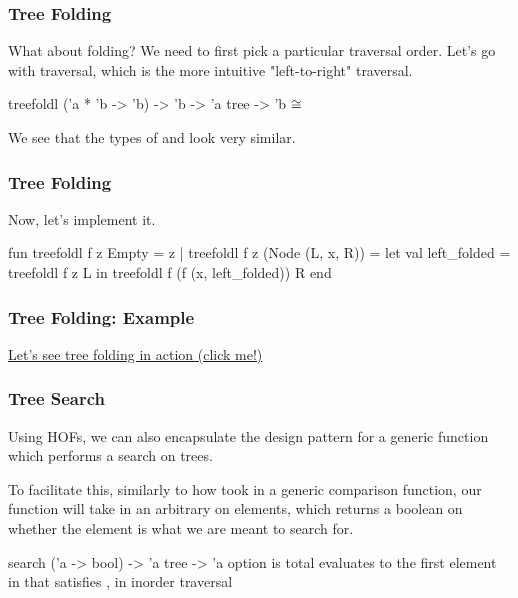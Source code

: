 \documentclass[aspectratio=169]{beamer}
\begin{document}
\begin{frame}[fragile]
  \frametitle{Tree Folding}

  What about folding? We need to first pick a particular traversal order. Let's
  go with  traversal, which is the more intuitive "left-to-right"
  traversal.

  \pause
  \vspace{\fill}

  \spec
    {treefoldl}
    {('a * 'b -> 'b) -> 'b -> 'a tree -> 'b}
    {}
    { $\cong$ }

  \pause
  \vspace{\fill}

  We see that the types of  and  look very
  similar.
\end{frame}

\begin{frame}[fragile]
  \frametitle{Tree Folding}

  Now, let's implement it.

  \pause
  \vspace{\fill}

  \begin{codeblock}
    fun treefoldl f z Empty = z
      | treefoldl f z (Node (L, x, R)) =
          let
            val left_folded = treefoldl f z L
          in
            treefoldl f (f (x, left_folded)) R
          end
  \end{codeblock}
\end{frame}

\begin{frame}[fragile]
  \frametitle{Tree Folding: Example}

  {\color{blue}\href{https://asciinema.org/a/vb4tp7vH1aFMNHKabkex1TsJH}{Let's see tree folding in action (click me!)}}

\end{frame}

\begin{frame}[fragile]
  \frametitle{Tree Search}

  Using HOFs, we can also encapsulate the design pattern for a generic function which
  performs a search on trees.

  \pause
  \vspace{\fill}

  To facilitate this, similarly to how  took in a generic comparison function,
  our  function will take in an arbitrary  on elements, which
  returns a boolean on whether the element is what we are meant to search for. 

  \pause
  \vspace{\fill}

  \spec
    {search}
    {('a -> bool) -> 'a tree -> 'a option}
    { is total}
    { evaluates to the first element in  that satisfies , in
    inorder traversal}
\end{frame}
\end{document}
